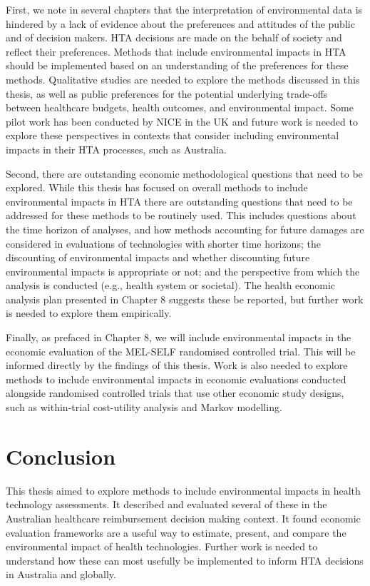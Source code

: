 \begin{refsection}
First, we note in several chapters that the interpretation of environmental data is hindered by a lack of evidence about the preferences and attitudes of the public and of decision makers. HTA decisions are made on the behalf of society and reflect their preferences. Methods that include environmental impacts in HTA should be implemented based on an understanding of the preferences for these methods. Qualitative studies are needed to explore the methods discussed in this thesis, as well as public preferences for the potential underlying trade-offs between healthcare budgets, health outcomes, and environmental impact. Some pilot work has been conducted by NICE in the UK and future work is needed to explore these perspectives in contexts that consider including environmental impacts in their HTA processes, such as Australia.\cite{nice_nice_2023}

Second, there are outstanding economic methodological questions that need to be explored. While this thesis has focused on overall methods to include environmental impacts in HTA there are outstanding questions that need to be addressed for these methods to be routinely used. This includes questions about the time horizon of analyses, and how methods accounting for future damages are considered in evaluations of technologies with shorter time horizons; the discounting of environmental impacts and whether discounting future environmental impacts is appropriate or not; and the perspective from which the analysis is conducted (e.g., health system or societal). The health economic analysis plan presented in Chapter 8 suggests these be reported, but further work is needed to explore them empirically.

Finally, as prefaced in Chapter 8, we will include environmental impacts in the economic evaluation of the MEL-SELF randomised controlled trial. This will be informed directly by the findings of this thesis. Work is also needed to explore methods to include environmental impacts in economic evaluations conducted alongside randomised controlled trials that use other economic study designs, such as within-trial cost-utility analysis and Markov modelling. 

\section{Conclusion}
This thesis aimed to explore methods to include environmental impacts in health technology assessments. It described and evaluated several of these in the Australian healthcare reimbursement decision making context. It found economic evaluation frameworks are a useful way to estimate, present, and compare the environmental impact of health technologies. Further work is needed to understand how these can most usefully be implemented to inform HTA decisions in Australia and globally. 

\printbibliography[heading=subbibliography]
\end{refsection}